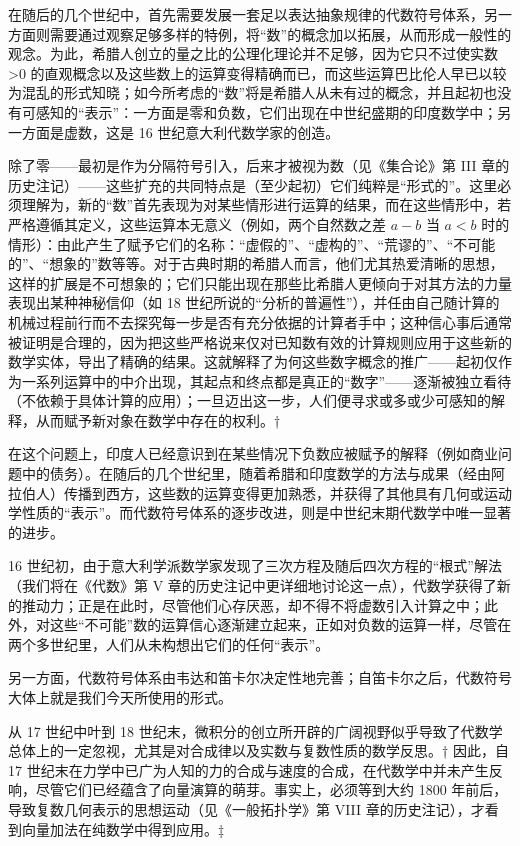 在随后的几个世纪中，首先需要发展一套足以表达抽象规律的代数符号体系，另一方面则需要通过观察足够多样的特例，将“数”的概念加以拓展，从而形成一般性的观念。为此，希腊人创立的量之比的公理化理论并不足够，因为它只不过使实数 \textgreater0 的直观概念以及这些数上的运算变得精确而已，而这些运算巴比伦人早已以较为混乱的形式知晓；如今所考虑的“数”将是希腊人从未有过的概念，并且起初也没有可感知的“表示”：一方面是零和负数，它们出现在中世纪盛期的印度数学中；另一方面是虚数，这是 16 世纪意大利代数学家的创造。

除了零——最初是作为分隔符号引入，后来才被视为数（见《集合论》第 III 章的历史注记）——这些扩充的共同特点是（至少起初）它们纯粹是“形式的”。这里必须理解为，新的“数”首先表现为对某些情形进行运算的结果，而在这些情形中，若严格遵循其定义，这些运算本无意义（例如，两个自然数之差 \(a - b\) 当 \(a < b\) 时的情形）：由此产生了赋予它们的名称：“虚假的”、“虚构的”、“荒谬的”、“不可能的”、“想象的”数等等。对于古典时期的希腊人而言，他们尤其热爱清晰的思想，这样的扩展是不可想象的；它们只能出现在那些比希腊人更倾向于对其方法的力量表现出某种神秘信仰（如 18 世纪所说的“分析的普遍性”），并任由自己随计算的机械过程前行而不去探究每一步是否有充分依据的计算者手中；这种信心事后通常被证明是合理的，因为把这些严格说来仅对已知数有效的计算规则应用于这些新的数学实体，导出了精确的结果。这就解释了为何这些数字概念的推广——起初仅作为一系列运算中的中介出现，其起点和终点都是真正的“数字”——逐渐被独立看待（不依赖于具体计算的应用）；一旦迈出这一步，人们便寻求或多或少可感知的解释，从而赋予新对象在数学中存在的权利。†

在这个问题上，印度人已经意识到在某些情况下负数应被赋予的解释（例如商业问题中的债务）。在随后的几个世纪里，随着希腊和印度数学的方法与成果（经由阿拉伯人）传播到西方，这些数的运算变得更加熟悉，并获得了其他具有几何或运动学性质的“表示”。而代数符号体系的逐步改进，则是中世纪末期代数学中唯一显著的进步。

16 世纪初，由于意大利学派数学家发现了三次方程及随后四次方程的“根式”解法（我们将在《代数》第 V 章的历史注记中更详细地讨论这一点），代数学获得了新的推动力；正是在此时，尽管他们心存厌恶，却不得不将虚数引入计算之中；此外，对这些“不可能”数的运算信心逐渐建立起来，正如对负数的运算一样，尽管在两个多世纪里，人们从未构想出它们的任何“表示”。

另一方面，代数符号体系由韦达和笛卡尔决定性地完善；自笛卡尔之后，代数符号大体上就是我们今天所使用的形式。

从 17 世纪中叶到 18 世纪末，微积分的创立所开辟的广阔视野似乎导致了代数学总体上的一定忽视，尤其是对合成律以及实数与复数性质的数学反思。† 因此，自 17 世纪末在力学中已广为人知的力的合成与速度的合成，在代数学中并未产生反响，尽管它们已经蕴含了向量演算的萌芽。事实上，必须等到大约 1800 年前后，导致复数几何表示的思想运动（见《一般拓扑学》第 VIII 章的历史注记），才看到向量加法在纯数学中得到应用。‡

